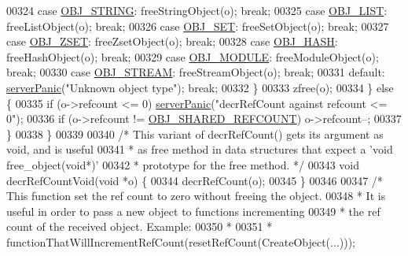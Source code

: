 \begin{DoxyCode}
00324         \textcolor{keywordflow}{case} \hyperlink{server_8h_a65236ea160f69cdef33ec942092af88f}{OBJ\_STRING}: freeStringObject(o); \textcolor{keywordflow}{break};
00325         \textcolor{keywordflow}{case} \hyperlink{server_8h_a4a5f22a280949c97a0cb0d4213275126}{OBJ\_LIST}: freeListObject(o); \textcolor{keywordflow}{break};
00326         \textcolor{keywordflow}{case} \hyperlink{server_8h_a8d179375a4aac33d3fa7aa80c8ccc75f}{OBJ\_SET}: freeSetObject(o); \textcolor{keywordflow}{break};
00327         \textcolor{keywordflow}{case} \hyperlink{server_8h_a8c356422ddbc03bd77694880a30a1953}{OBJ\_ZSET}: freeZsetObject(o); \textcolor{keywordflow}{break};
00328         \textcolor{keywordflow}{case} \hyperlink{server_8h_a87c05ba4f7f36741864277f02a4423fb}{OBJ\_HASH}: freeHashObject(o); \textcolor{keywordflow}{break};
00329         \textcolor{keywordflow}{case} \hyperlink{server_8h_a92c1fed85f709180fda0ff10d37d649b}{OBJ\_MODULE}: freeModuleObject(o); \textcolor{keywordflow}{break};
00330         \textcolor{keywordflow}{case} \hyperlink{server_8h_a2c2cc41300ca6b9daca7ea8a6d66edc6}{OBJ\_STREAM}: freeStreamObject(o); \textcolor{keywordflow}{break};
00331         \textcolor{keywordflow}{default}: \hyperlink{server_8h_a11cc378e7778a830b41240578de3b204}{serverPanic}(\textcolor{stringliteral}{"Unknown object type"}); \textcolor{keywordflow}{break};
00332         \}
00333         zfree(o);
00334     \} \textcolor{keywordflow}{else} \{
00335         \textcolor{keywordflow}{if} (o->refcount <= 0) \hyperlink{server_8h_a11cc378e7778a830b41240578de3b204}{serverPanic}(\textcolor{stringliteral}{"decrRefCount against refcount <= 0"});
00336         \textcolor{keywordflow}{if} (o->refcount != \hyperlink{server_8h_a1dc2a137875b0c8ee0fa1df43684a7b8}{OBJ\_SHARED\_REFCOUNT}) o->refcount--;
00337     \}
00338 \}
00339 
00340 \textcolor{comment}{/* This variant of decrRefCount() gets its argument as void, and is useful}
00341 \textcolor{comment}{ * as free method in data structures that expect a 'void free\_object(void*)'}
00342 \textcolor{comment}{ * prototype for the free method. */}
00343 \textcolor{keywordtype}{void} decrRefCountVoid(\textcolor{keywordtype}{void} *o) \{
00344     decrRefCount(o);
00345 \}
00346 
00347 \textcolor{comment}{/* This function set the ref count to zero without freeing the object.}
00348 \textcolor{comment}{ * It is useful in order to pass a new object to functions incrementing}
00349 \textcolor{comment}{ * the ref count of the received object. Example:}
00350 \textcolor{comment}{ *}
00351 \textcolor{comment}{ *    functionThatWillIncrementRefCount(resetRefCount(CreateObject(...)));}

\end{DoxyCode}
